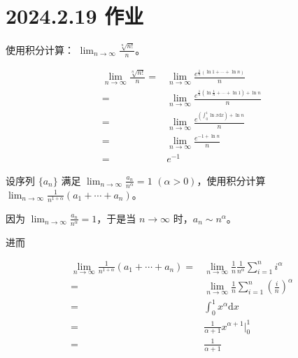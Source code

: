 \ifx\allfiles\undefined

\date{}
\author{尹锦润}

\maketitle
\fi

\section{2024.2.19 作业}

\begin{ques}
使用积分计算： $\displaystyle \lim _{n\rightarrow \infty }\frac{\sqrt[n]{n!}}{n}$。

\end{ques}



\begin{equation*}
\begin{aligned}
\lim _{n\rightarrow \infty }\frac{\sqrt[n]{n!}}{n} = & \lim _{n\rightarrow \infty }\frac{e^{\frac{1}{n}(\ln 1+\cdots +\ln n)}}{n}\\
= & \lim _{n\rightarrow \infty }\frac{e^{\frac{1}{n}\left(\ln\frac{1}{n} +\cdots +\ln 1\right) +\ln n}}{n}\\
= & \lim _{n\rightarrow \infty }\frac{e^{\left(\int _{0}^{1}\ln x\mathrm{d} x\right) +\ln n}}{n}\\
= & \lim _{n\rightarrow \infty }\frac{e^{-1+\ln n}}{n}\\
= & e^{-1}
\end{aligned}
\end{equation*}


\begin{ques}
设序列 $\{a_{n} \}$ 满足 $\lim _{n\rightarrow \infty }\frac{a_{n}}{n^{\alpha }} =1$ $(\alpha  >0)$，使用积分计算 $\displaystyle \lim _{n\rightarrow \infty }\frac{1}{n^{1+\alpha }}( a_{1} +\cdots +a_{n})$。

\end{ques}


因为 $\lim _{n\rightarrow \infty }\frac{a_{n}}{n^{\alpha }} =1$，于是当 $\displaystyle n\rightarrow \infty $ 时，$\displaystyle a_{n} \sim n^{\alpha }$。

进而


\begin{equation*}
\begin{aligned}
\lim _{n\rightarrow \infty }\frac{1}{n^{1+\alpha }}( a_{1} +\cdots +a_{n}) = & \lim _{n\rightarrow \infty }\frac{1}{n}\frac{1}{n^{\alpha }}\sum _{i=1}^{n} i^{\alpha }\\
= & \lim _{n\rightarrow \infty }\frac{1}{n}\sum _{i=1}^{n}\left(\frac{i}{n}\right)^{\alpha }\\
= & \int _{0}^{1} x^{\alpha }\mathrm{d} x\\
= & \frac{1}{\alpha +1} x^{\alpha +1} |_{0}^{1}\\
= & \frac{1}{\alpha +1}
\end{aligned}
\end{equation*}




